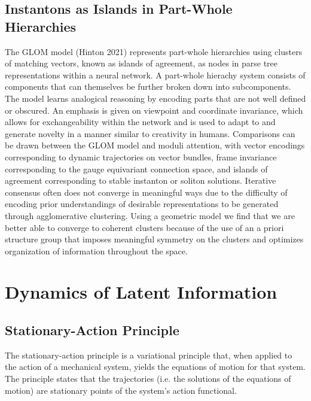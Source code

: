 \documentclass{article}
\begin{document}
    \subsection{Instantons as Islands in Part-Whole Hierarchies}
    The GLOM model (Hinton 2021) represents part-whole hierarchies using clusters of matching vectors, known as islands of agreement, as nodes in parse tree representations within a neural network. A part-whole hierachy system consists of components that can themselves be further broken down into subcomponents. The model learns analogical reasoning by encoding parts that are not well defined or obscured. An emphasis is given on viewpoint and coordinate invariance, which allows for exchangeability within the network and is used to adapt to and generate novelty in a manner similar to creativity in humans. Comparisons can be drawn between the GLOM model and moduli attention, with vector encodings corresponding to dynamic trajectories on vector bundles, frame invariance corresponding to the gauge equivariant connection space, and islands of agreement corresponding to stable instanton or soliton solutions. Iterative consensus often does not converge in meaningful ways due to the difficulty of encoding prior understandings of desirable representations to be generated through agglomerative clustering. Using a geometric model we find that we are better able to converge to coherent clusters because of the use of an a priori structure group that imposes meaningful symmetry on the clusters and optimizes organization of information throughout the space. 
    
    
\section{Dynamics of Latent Information}


\subsection{Stationary-Action Principle}
The stationary-action principle is a variational principle that, when applied to the action of a mechanical system, yields the equations of motion for that system. The principle states that the trajectories (i.e. the solutions of the equations of motion) are stationary points of the system's action functional.
\end{document}
